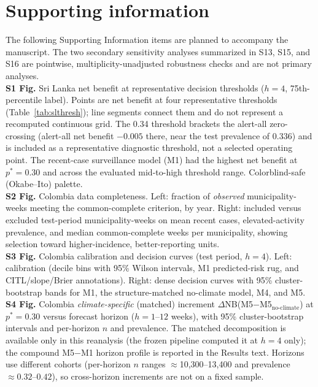 \documentclass[11pt,a4paper]{article}
\begin{document}
\section*{Supporting information}
\begingroup{}
\noindent The following Supporting Information items are planned to accompany the manuscript. The two secondary sensitivity analyses summarized in S13, S15, and S16 are pointwise, multiplicity-unadjusted robustness checks and are not primary analyses.\\[0.4em]
\noindent\textbf{S1 Fig.} Sri Lanka net benefit at representative decision thresholds ($h=4$, 75th-percentile label). Points are net benefit at four representative thresholds (Table~\ref{tab:slthresh}); line segments connect them and do not represent a recomputed continuous grid. The 0.34 threshold brackets the alert-all zero-crossing (alert-all net benefit $-0.005$ there, near the test prevalence of 0.336) and is included as a representative diagnostic threshold, not a selected operating point. The recent-case surveillance model (M1) had the highest net benefit at $p^*=0.30$ and across the evaluated mid-to-high threshold range. Colorblind-safe (Okabe--Ito) palette.\\
\textbf{S2 Fig.} Colombia data completeness. Left: fraction of \emph{observed} municipality-weeks meeting the common-complete criterion, by year. Right: included versus excluded test-period municipality-weeks on mean recent cases, elevated-activity prevalence, and median common-complete weeks per municipality, showing selection toward higher-incidence, better-reporting units.\\
\textbf{S3 Fig.} Colombia calibration and decision curves (test period, $h=4$). Left: calibration (decile bins with 95\% Wilson intervals, M1 predicted-risk rug, and CITL/slope/Brier annotations). Right: dense decision curves with 95\% cluster-bootstrap bands for M1, the structure-matched no-climate model, M4, and M5.\\
\textbf{S4 Fig.} Colombia \emph{climate-specific} (matched) increment $\Delta$NB(M5$-$M5$_{\text{no-climate}}$) at $p^*=0.30$ versus forecast horizon ($h=1$--$12$ weeks), with 95\% cluster-bootstrap intervals and per-horizon $n$ and prevalence. The matched decomposition is available only in this reanalysis (the frozen pipeline computed it at $h=4$ only); the compound M5$-$M1 horizon profile is reported in the Results text. Horizons use different cohorts (per-horizon $n$ ranges $\approx$10{,}300--13{,}400 and prevalence $\approx0.32$--$0.42$), so cross-horizon increments are not on a fixed sample.\\
\end{document}
